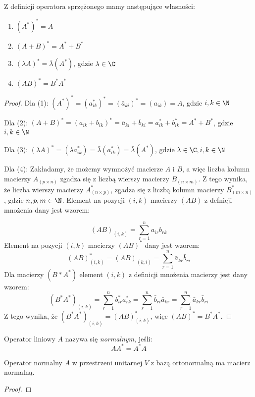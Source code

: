 \begin{theorem}\label{theorem:properties_of_conjugated_operator}
    Z definicji operatora sprzężonego mamy następujące własności:
    \begin{enumerate}[leftmargin=1cm, itemsep=2pt, label=(\arabic*)]
        \item $(A^*)^* = A$
        \item $(A + B)^* = A^* + B^*$
        \item $(\lambda A)^* = \bar{\lambda}(A^*)$, gdzie $\lambda \in \C$
        \item $(AB)^* = B^*A^*$
    \end{enumerate}
\end{theorem}
\begin{proof}
Dla (1): $(A^*)^* = (a^*_{ik})^* = (\bar{a}_{ki})^* = (a_{ik}) = A$, gdzie $i, k \in \N$

Dla (2):
$(A + B)^* = (a_{ik} + b_{ik})^* = \bar{a}_{ki} + \bar{b}_{ki} = a^*_{ik} + b^*_{ik} = A^* + B^*$, gdzie $i, k \in \N$

Dla (3):
$(\lambda A)^* = (\lambda a^*_{ik}) = \bar{\lambda}(a^*_{ik}) = \bar{\lambda}(A^*)$, gdzie $\lambda \in \C, i, k \in \N$

Dla (4):
Zakładamy, że możemy wymnożyć macierze $A$ i $B$, a więc liczba kolumn macierzy $A_{(p \times n)}$ zgadza się z liczbą wierszy macierzy $B_{(n \times m)}$. Z tego wynika, że liczba wierszy macierzy $A^*_{(n \times p)}$, zgadza się z liczbą kolumn macierzy $B^*_{(m \times n)}$, gdzie $n, p, m \in \N$.
Element na pozycji $(i, k)$ macierzy $(AB)$ z defnicji mnożenia dany jest wzorem: 

$$(AB)_{(i, k)} = \sum_{r=1}^{n}{a_{ir}b_{rk}}$$
Element na pozycji $(i, k)$ macierzy $(AB)^*$ dany jest wzorem:
$$(AB)^*_{(i, k)} = \overline{(AB)}_{(k, i)} = \sum_{r=1}^{n}{\bar{a}_{kr}\bar{b}_{ri}}$$
Dla macierzy $(B*A^*)$ element $(i, k)$ z definicji mnożenia macierzy jest dany wzorem:
$$(B^*A^*)_{(i, k)} = \sum_{r=1}^{n}{b^*_{ir}a^*_{rk}} = \sum_{r=1}^{n}{\bar{b}_{ri}\bar{a}_{kr}} = \sum_{r=1}^{n}{\bar{a}_{kr}\bar{b}_{ri}}$$
Z tego wynika, że $(B^*A^*)_{(i, k)} = (AB)^*_{(i, k)}$, więc $(AB)^* = B^*A^*$.
\end{proof}

\begin{definition}\label{def:complex_normal_operator}
Operator liniowy $A$ nazywa się \textit{normalnym}, jeśli:
$$AA^* = A^*A$$
\end{definition}
\begin{theorem}
    Operator normalny $A$ w przestrzeni unitarnej $V$ z bazą ortonormalną ma macierz normalną.
\end{theorem}
\begin{proof}
\end{proof}

